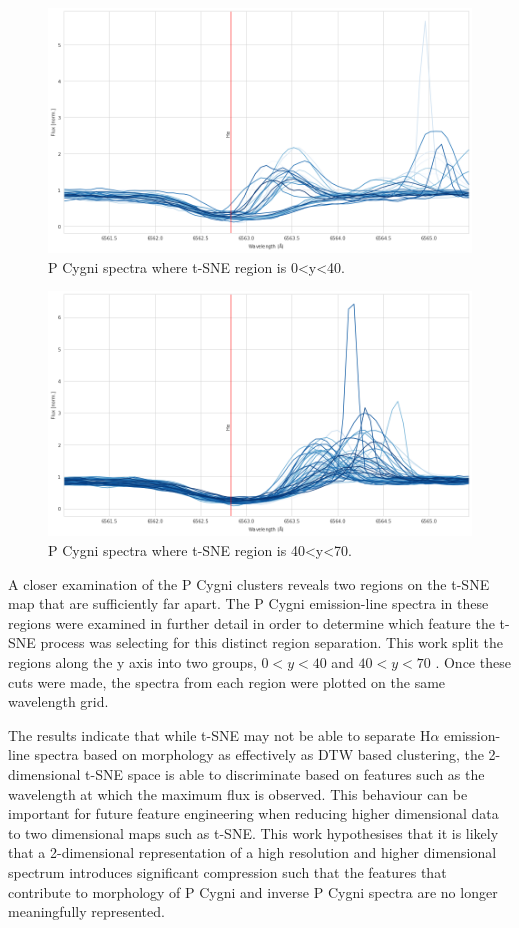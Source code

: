 \begin{figure}[!htb]
\centering
\includegraphics[scale=0.45]{figures/spectra less than 40.png}
\caption{P Cygni spectra where t-SNE region is 0<y<40. }
\end{figure}

\begin{figure}[!htb]
\centering
\includegraphics[scale=0.45]{figures/spectra greater than 40.png}
\caption{P Cygni spectra where t-SNE region is 40<y<70. }
\end{figure}

A closer examination of the P Cygni clusters reveals two regions on the t-SNE map that are sufficiently far apart. The P Cygni emission-line spectra in these regions were examined in further detail in order to determine which feature the t-SNE process was selecting for this distinct region separation. This work split the regions along the y axis into two groups, $0<y<40$ and $40<y<70$ . Once these cuts were made, the spectra from each region were plotted on the same wavelength grid. 

The results indicate that while t-SNE may not be able to separate H$\alpha$ emission-line spectra based on morphology as effectively as DTW based clustering, the 2-dimensional t-SNE space is able to discriminate based on features such as the wavelength at which the maximum flux is observed. This behaviour can be important for future feature engineering when reducing higher dimensional data to two dimensional maps such as t-SNE. This work hypothesises that it is likely that a 2-dimensional representation of a high resolution and higher dimensional spectrum introduces significant compression such that the features that contribute to morphology of P Cygni and inverse P Cygni spectra are no longer meaningfully represented.

